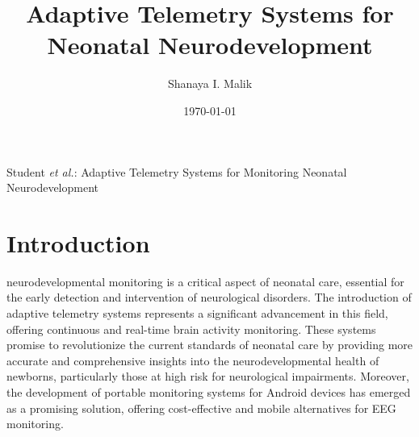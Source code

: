 \documentclass[12pt,journal,compsoc]{IEEEtran}
\begin{document}
\title{Adaptive Telemetry Systems for Neonatal Neurodevelopment}
\author{Shanaya I. Malik}

\date{\today}

%
{Student \MakeLowercase{\textit{et al.}}: Adaptive Telemetry Systems for Monitoring Neonatal Neurodevelopment}



\maketitle

\section{Introduction}

 neurodevelopmental monitoring is a critical aspect of neonatal care, essential for the early detection and intervention of neurological disorders. The introduction of adaptive telemetry systems represents a significant advancement in this field, offering continuous and real-time brain activity monitoring. These systems promise to revolutionize the current standards of neonatal care by providing more accurate and comprehensive insights into the neurodevelopmental health of newborns, particularly those at high risk for neurological impairments. Moreover, the development of portable monitoring systems for Android devices has emerged as a promising solution, offering cost-effective and mobile alternatives for EEG monitoring.
\end{document}

